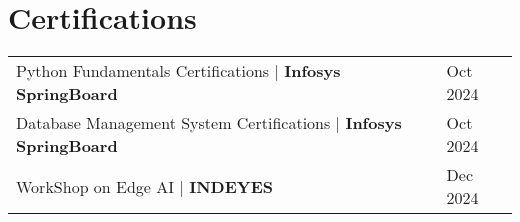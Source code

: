 \documentclass[a4paper,12pt]{article}
\begin{document}
 
\section{Certifications}
\begin{tabularx}{\linewidth}{@{}l X@{}}	
Python Fundamentals Certifications | \textbf{Infosys SpringBoard} &\hfill Oct 2024\\
Database Management System  Certifications | \textbf{Infosys SpringBoard} &\hfill Oct 2024\\
WorkShop on Edge AI | \textbf{INDEYES} &\hfill Dec 2024\\
\end{tabularx}
\end{document}
